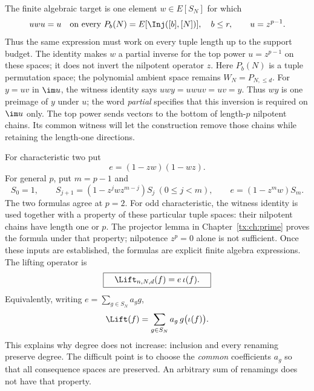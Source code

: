 The finite algebraic target is one element $w\in E[S_N]$ for which
\begin{equation}\label{tx:lift-eq:witness}
 u w u=u\quad\text{on every }P_b(N)=E[\Inj([b],[N])],\quad b\le r,
 \qquad u=z^{p-1}.
\end{equation}
Thus the same expression must work on every tuple length up to the
support budget. The identity makes $w$ a partial inverse for the
top power $u=z^{p-1}$ on these spaces; it does not invert the nilpotent
operator $z$. Here $P_b(N)$ is a tuple permutation space; the
polynomial ambient space remains $W_N=P_{N,\le d}$.
For $y=uv$ in $\im u$, the witness identity says $uwy=uwuv=uv=y$.
Thus $wy$ is one preimage of $y$ under $u$; the word \emph{partial}
specifies that this inversion is required on $\im u$ only.
The top power sends vectors to the bottom of length-$p$ nilpotent
chains. Its common witness will let the construction remove those
chains while retaining the length-one directions.

For characteristic two put
\[
                         e=(1-zw)(1-wz).
\]
For general $p$, put $m=p-1$ and
\begin{equation}\label{tx:eq:projector}
 S_0=1,\qquad S_{j+1}=(1-z^jwz^{m-j})S_j\ (0\le j<m),
 \qquad e=(1-z^mw)S_m.
\end{equation}
The two formulas agree at $p=2$. For odd characteristic, the witness
identity is used together with a property of these particular tuple
spaces: their nilpotent chains have length one or $p$. The projector
lemma in Chapter~\ref{tx:ch:prime} proves the formula under that
property; nilpotence $z^p=0$ alone is not sufficient. Once these inputs
are established, the formulas are explicit finite algebra expressions.
The lifting operator is
\begin{equation}\label{tx:lift-eq:actual-lift}
 \boxed{\quad\Lift_{n,N,d}(f)=e\,\iota(f).\quad}
\end{equation}
Equivalently, writing $e=\sum_{g\in S_N}a_g g$,
\[
                    \Lift(f)=\sum_{g\in S_N}a_g\,g\bigl(\iota(f)\bigr).
\]
This explains why degree does not increase: inclusion and every
renaming preserve degree. The difficult point is to choose the
\emph{common} coefficients $a_g$ so that all consequence spaces are
preserved. An arbitrary sum of renamings does not have that property.

